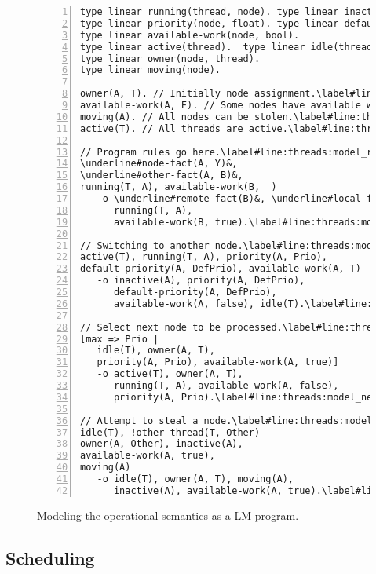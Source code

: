 \begin{figure}[h!]
\begin{Verbatim}[numbers=left,fontsize=\codesize,commandchars=\\\#\&]
type linear running(thread, node). type linear inactive(node).
type linear priority(node, float). type linear default-priority(node, float).
type linear available-work(node, bool).
type linear active(thread).  type linear idle(thread).
type linear owner(node, thread).
type linear moving(node).

owner(A, T). // Initially node assignment.\label#line:threads:model_owner&
available-work(A, F). // Some nodes have available work.\label#line:threads:model_available&
moving(A). // All nodes can be stolen.\label#line:threads:model_moving&
active(T). // All threads are active.\label#line:threads:model_active&

// Program rules go here.\label#line:threads:model_rule1&
\underline#node-fact(A, Y)&,
\underline#other-fact(A, B)&,
running(T, A), available-work(B, _)
   -o \underline#remote-fact(B)&, \underline#local-fact(A)&,
      running(T, A),
      available-work(B, true).\label#line:threads:model_rule2&

// Switching to another node.\label#line:threads:model_drop_node1&
active(T), running(T, A), priority(A, Prio),
default-priority(A, DefPrio), available-work(A, T)
   -o inactive(A), priority(A, DefPrio),
      default-priority(A, DefPrio),
      available-work(A, false), idle(T).\label#line:threads:model_drop_node2&

// Select next node to be processed.\label#line:threads:model_next_node1&
[max => Prio |
   idle(T), owner(A, T),
   priority(A, Prio), available-work(A, true)]
   -o active(T), owner(A, T),
      running(T, A), available-work(A, false),
      priority(A, Prio).\label#line:threads:model_next_node2&

// Attempt to steal a node.\label#line:threads:model_steal1&
idle(T), !other-thread(T, Other)
owner(A, Other), inactive(A),
available-work(A, true),
moving(A)
   -o idle(T), owner(A, T), moving(A),
      inactive(A), available-work(A, true).\label#line:threads:model_steal2&
\end{Verbatim}
\caption{Modeling the operational semantics as a LM program.}
\label{code:threads:modeling}
\end{figure}

\subsection{Scheduling}

